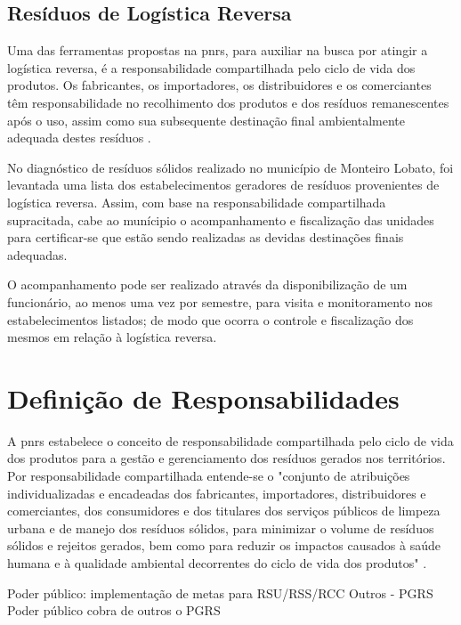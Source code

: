 	\subsection{Resíduos de Logística Reversa}
	Uma das ferramentas propostas na \gls{pnrs}, para auxiliar na busca por atingir a logística reversa, é a responsabilidade compartilhada pelo ciclo de vida dos produtos. Os fabricantes, os importadores, os distribuidores e os comerciantes têm responsabilidade no recolhimento dos produtos e dos resíduos remanescentes após o uso, assim como sua subsequente destinação final ambientalmente adequada destes resíduos \cite{brasil:12305}.
	
	No diagnóstico de resíduos sólidos realizado no município de Monteiro Lobato, foi levantada uma lista dos estabelecimentos geradores de resíduos provenientes de logística reversa. Assim, com base na responsabilidade compartilhada supracitada, cabe ao munícipio o acompanhamento e fiscalização das unidades para certificar-se que estão sendo realizadas as devidas destinações finais adequadas. 
	
	O acompanhamento pode ser realizado através da disponibilização de um funcionário, ao menos uma vez por semestre, para visita e monitoramento nos estabelecimentos listados; de modo que ocorra o controle e fiscalização dos mesmos em relação à logística reversa.
	
\newpage
\section{Definição de Responsabilidades} %
\label{sec:def_resp}
	
A \gls{pnrs} estabelece o conceito de responsabilidade compartilhada pelo ciclo de vida dos produtos para a gestão e gerenciamento dos resíduos gerados nos territórios. Por responsabilidade compartilhada entende-se o "conjunto de atribuições individualizadas e encadeadas dos fabricantes, importadores, distribuidores e comerciantes, dos consumidores e dos titulares dos serviços públicos de limpeza urbana e de manejo dos resíduos sólidos, para minimizar o volume de resíduos sólidos e rejeitos gerados, bem como para reduzir os impactos causados à saúde humana e à qualidade ambiental decorrentes do ciclo de vida dos produtos" \cite{brasil:12305}.

Poder público: implementação de metas para RSU/RSS/RCC
Outros - PGRS
Poder público cobra de outros o PGRS


